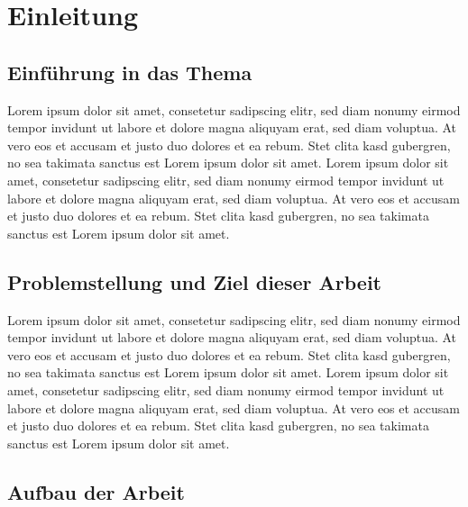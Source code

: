 \documentclass[a4paper,12pt]{article}
\begin{document}
\clearpage

\setcounter{romanPagenumber}{\value{page}} %


\pagestyle{fancy}
\fancyhead{}
\fancyhead[RO,LE]{\thepage}
\fancyfoot[CO,CE]{}

\nocite{*} 



\section{Einleitung}
\subsection{Einführung in das Thema}
Lorem ipsum dolor sit amet, consetetur sadipscing elitr, sed diam nonumy eirmod tempor invidunt ut labore et dolore magna aliquyam erat, sed diam voluptua. At vero eos et accusam et justo duo dolores et ea rebum. Stet clita kasd gubergren, no sea takimata sanctus est Lorem ipsum dolor sit amet. Lorem ipsum dolor sit amet, consetetur sadipscing elitr, sed diam nonumy eirmod tempor invidunt ut labore et dolore magna aliquyam erat, sed diam voluptua. At vero eos et accusam et justo duo dolores et ea rebum. Stet clita kasd gubergren, no sea takimata sanctus est Lorem ipsum dolor sit amet.

\subsection{Problemstellung und Ziel dieser Arbeit}

Lorem ipsum dolor sit amet, consetetur sadipscing elitr, sed diam nonumy eirmod tempor invidunt ut labore et dolore magna aliquyam erat, sed diam voluptua. At vero eos et accusam et justo duo dolores et ea rebum. Stet clita kasd gubergren, no sea takimata sanctus est Lorem ipsum dolor sit amet. Lorem ipsum dolor sit amet, consetetur sadipscing elitr, sed diam nonumy eirmod tempor invidunt ut labore et dolore magna aliquyam erat, sed diam voluptua. At vero eos et accusam et justo duo dolores et ea rebum. Stet clita kasd gubergren, no sea takimata sanctus est Lorem ipsum dolor sit amet.

\subsection{Aufbau der Arbeit}
\end{document}
